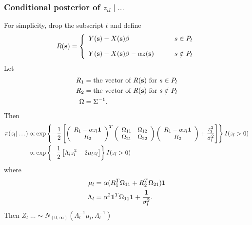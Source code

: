 \subsubsection*{Conditional posterior of $z_{tl} \mid \ldots $}\label{s:mvcondu}
For simplicity, drop the subscript $t$ and define 
\begin{align*}
R(\mbox{\bf s}) = \left\{ 
    \begin{array}{ll}
        Y(\mbox{\bf s}) - X(\mbox{\bf s}) \beta &s \in P_l\\[1em]
        Y(\mbox{\bf s}) - X(\mbox{\bf s}) \beta - \alpha z(\mbox{\bf s}) \qquad & s \notin P_l
    \end{array} 
\right.
\end{align*}
Let 
\begin{align*}
    R_1 &= \text{the vector of } R(\mbox{\bf s}) \text{ for } s \in P_l \\
    R_2 &= \text{the vector of } R(\mbox{\bf s}) \text{ for } s \notin P_l \\
    \Omega &= \Sigma^{-1}.
\end{align*}
Then
\begin{align*}
    \pi(z_l | \ldots) &\propto \exp \left\{ -\frac{ 1 }{ 2 } \left[
        \left( \begin{array}{c}
            R_1 - \alpha z_l \mbox{\boldmath $1$}\\
            R_2
        \end{array} \right)^T
        \left( \begin{array}{cc}
            \Omega_{11} & \Omega_{12}\\
            \Omega_{21} & \Omega_{22}
        \end{array} \right)
        \left( \begin{array}{c}
            R_1 - \alpha z_l \mbox{\boldmath $1$}\\
            R_2
        \end{array} \right)
        +  \frac{ z_l^2 }{ \sigma_l^2 }\right]
    \right\} I(z_l > 0) \\
        &\propto \exp \left\{ -\frac{ 1 }{ 2 } \left[ \Lambda_l z_l^2 - 2 \mu_l z_l \right] \right\} I(z_l > 0)
\end{align*}
where
\begin{align*}
    \mu_l &= \alpha ( R_1^T \Omega_{11} + R_2^T \Omega_{21} )\mbox{\boldmath $1$}\\
    \Lambda_l &= \alpha^2 \mbox{\boldmath $1$}^T \Omega_{11} \mbox{\boldmath $1$} + \frac{ 1 }{ \sigma^2_l }.
\end{align*}
Then $Z_l | \ldots \sim N_{(0, \infty)} (\Lambda_l^{-1} \mu_l, \Lambda_l^{-1})$